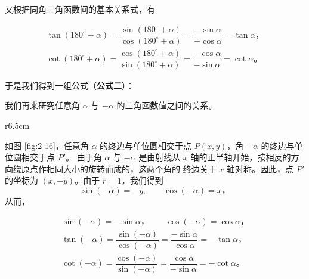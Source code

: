 又根据同角三角函数间的基本关系式，有

\vspace{-1em}\begin{gather*}
    \tan(180^\circ + \alpha) = \dfrac{\sin(180^\circ + \alpha)}{\cos(180^\circ + \alpha)} = \dfrac{-\sin\alpha}{-\cos\alpha} = \tan\alpha \text{，} \\
    \cot(180^\circ + \alpha) = \dfrac{\cos(180^\circ + \alpha)}{\sin(180^\circ + \alpha)} = \dfrac{-\cos\alpha}{-\sin\alpha} = \cot\alpha \text{。}
\end{gather*}
\vspace{0.5em}

于是我们得到一组公式（\textbf{公式二}）：

\begin{center}
\end{center}

我们再来研究任意角 $\alpha$ 与 $-\alpha$ 的三角函数值之间的关系。

\begin{wrapfigure}[12]{r}{6.5cm}
    \centering
    
    \vspace{-20pt}
    \caption{}\label{fig:2-16}
\end{wrapfigure}


如图 \ref{fig:2-16}，任意角 $\alpha$ 的终边与单位圆相交于点 $P(x, y)$，角 $-\alpha$ 的终边与单位圆相交于点 $P'$。
由于角 $\alpha$ 与 $-\alpha$ 是由射线从 $x$ 轴的正半轴开始，按相反的方向绕原点作相同大小的旋转而成的，这两个角的
终边关于 $x$ 轴对称。因此，点 $P'$ 的坐标为 $(x, -y)$。由于 $r = 1$，我们得到
$$\sin(-\alpha) = -y, \qquad \cos(-\alpha) = x \text{，}$$
从而，

\vspace{-1em}\begin{gather*}
    \sin(-\alpha) = -\sin\alpha \text{，} \qquad \cos(-\alpha) = \cos\alpha \text{，} \\
    \tan(-\alpha) = \dfrac{\sin(-\alpha)}{\cos(-\alpha)} = \dfrac{-\sin\alpha}{\cos\alpha} = -\tan\alpha \text{，} \\
    \cot(-\alpha) = \dfrac{\cos(-\alpha)}{\sin(-\alpha)} = \dfrac{\cos\alpha}{-\sin\alpha} = -\cot\alpha \text{。}
\end{gather*}
\vspace{0.5em}

